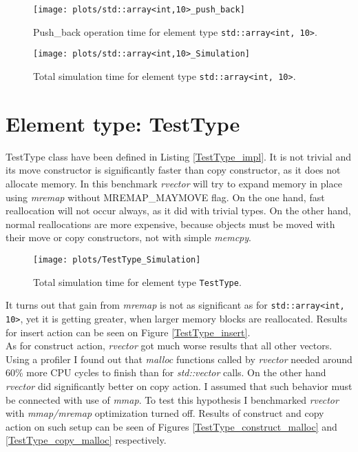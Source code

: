 \documentclass[inz, english, shortabstract]{iithesis}
\begin{document}
\begin{figure}[h!]
\label{array_push_back}
\texttt{[image: plots/std::array<int,10>\_push\_back]}
\caption{Push\_back operation time for element type \lstinline{std::array<int, 10>}.}
\end{figure}

\begin{figure}[h!]
\label{array_simulation}
\texttt{[image: plots/std::array<int,10>\_Simulation]}
\caption{Total simulation time for element type \lstinline{std::array<int, 10>}.}
\end{figure}

\clearpage
\section{Element type: TestType}
TestType class have been defined in Listing \ref{TestType_impl}. It is not trivial and its move constructor is significantly faster than copy constructor, as it does not allocate memory. In this benchmark  {\it rvector} will try to expand memory in place using {\it mremap} without MREMAP\_MAYMOVE flag. On the one hand, fast reallocation will not occur always, as it did with trivial types. On the other hand, normal reallocations are more expensive, because objects must be moved with their move or copy constructors, not with simple {\it memcpy}.

\begin{figure}[h!]
\label{TestType_push_back}
\texttt{[image: plots/TestType\_Simulation]}
\caption{Total simulation time for element type \lstinline{TestType}.}
\end{figure}

It turns out that gain from {\it mremap} is not as significant as for \lstinline{std::array<int, 10>}, yet it is getting greater, when larger memory blocks are reallocated. Results for insert action can be seen on Figure \ref{TestType_insert}. 
\\


As for construct action, {\it rvector} got much worse results that all other vectors. Using a profiler I found out that {\it malloc} functions called by {\it rvector} needed around 60\% more CPU cycles to finish than for {\it std::vector} calls. On the other hand {\it rvector} did significantly better on copy action. I assumed that such behavior must be connected with use of {\it mmap}. To test this hypothesis I benchmarked {\it rvector} with {\it mmap/mremap} optimization turned off. Results of construct and copy action on such setup can be seen of Figures \ref{TestType_construct_malloc} and \ref{TestType_copy_malloc} respectively.
\end{document}
